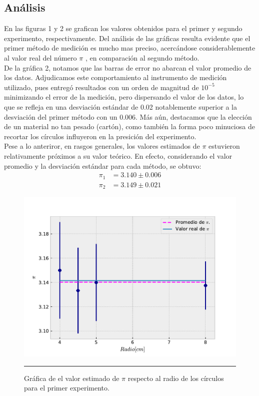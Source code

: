 \documentclass[10pt,a4paper]{article}
\begin{document}
	\begin{multicols}{2}
	\section{Análisis}
	En las figuras 1 y 2 se grafican los valores obtenidos para el primer y segundo experimento, respectivamente. Del análisis de las gráficas resulta evidente que el primer método de medición es mucho mas preciso, acercándose considerablemente al valor real del número $\pi$ , en comparación al segundo método.\\
	
	De la gráfica 2, notamos que las barras de error no abarcan el valor promedio de los datos. Adjudicamos este comportamiento al instrumento de medición utilizado, pues entregó resultados  con un orden de magnitud de $10^{-5}$ minimizando el error de la medición, pero dispersando el valor de los datos, lo que se refleja en una desviación estándar de 0.02 notablemente superior a la desviación del primer método con un 0.006. Más aún, destacamos que la elección de un material no tan pesado (cartón), como también la forma poco minuciosa de recortar los círculos influyeron en la presición del experimento.\\
	
	Pese a lo anteriror, en rasgos generales, los valores estimados de $\pi$ estuvieron relativamente próximos a su valor teórico. En efecto, considerando el valor promedio y la desviación estándar para cada método, se obtuvo:
	\begin{align}
	\pi_1 & = 3.140 \pm 0.006 \\
	\pi_2 & = 3.149 \pm 0.021
	\end{align}
	
	\begin{figure}[H]
			\centering
			\includegraphics[scale=0.5]{pi_metodo1.pdf}
			\caption{Gráfica de el valor estimado de $\pi$ respecto al radio de los círculos para el primer experimento.}
			\label{imagen primer exp}
			\rule{80mm}{0.1mm}
		\end{figure}
		

\end{multicols}
\end{document}
